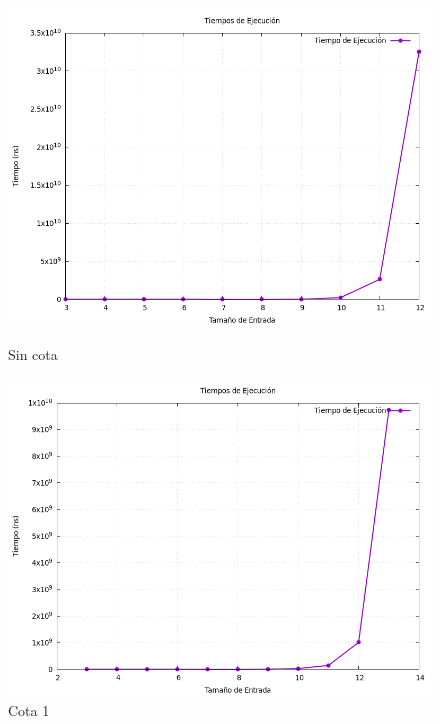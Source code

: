 \documentclass[11pt,openany]{book}
\begin{document}
\begin{figure}[H]
    \centering
    \begin{minipage}{.48\textwidth}
        \centering
        \includegraphics[width=1\linewidth]{assets/Img/grafico_tiempos0.png}
        \caption{Sin cota}
        \label{fig:Sin cota}
  \end{minipage}%
    \begin{minipage}{.48\textwidth}
          \centering
          \includegraphics[width=1\linewidth]{assets/Img/grafico_tiempos1.png}
          \caption{Cota 1}
          \label{fig:Cota 1}
    \end{minipage}%
    \begin{minipage}{.48\textwidth}
          \centering

\end{minipage}
\end{figure}
\end{document}

